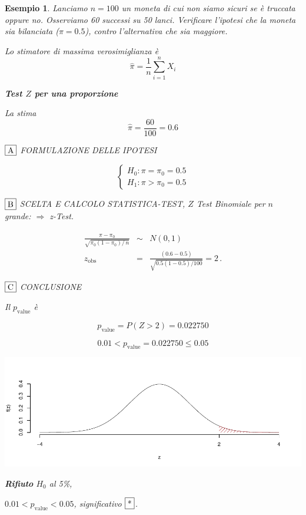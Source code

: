 \documentclass[
  11pt,
]{book}
\theoremstyle{mytheoremstyle}
\theoremstyle{mydefstyle}
\newtheorem{example}{{Esempio}}[section]
\begin{document}
\begin{example}
Lanciamo \(n=100\) un moneta di cui non siamo sicuri se è truccata oppure
no. Osserviamo 60 successi su 50 lanci. Verificare l'ipotesi che la moneta sia bilanciata (\(\pi=0.5\)), contro
l'alternativa che sia maggiore.

Lo stimatore di massima verosimiglianza è
\[\hat\pi=\frac 1 n \sum_{i=1}^n X_i\]

\textbf{Test \(Z\) per una proporzione}

La stima
\[\hat\pi=\frac { 60 } { 100 }= 0.6  \]

\(\fbox{A}\) FORMULAZIONE DELLE IPOTESI

\[\begin{cases}
   H_0: \pi = \pi_0=0.5 \\
   H_1: \pi > \pi_0=0.5 
   \end{cases}\]

\(\fbox{B}\) SCELTA E CALCOLO STATISTICA-TEST, \(Z\)
Test Binomiale per \(n\) grande: \(\Rightarrow\) z-Test.

\begin{eqnarray*}
   \frac{\hat\pi - \pi_{0}} {\sqrt {\pi_0(1-\pi_0)/\,n}}&\sim&N(0,1)\\
   z_{\text{obs}}
   &=& \frac{ ( 0.6 -  0.5 )} {\sqrt{ 0.5 (1- 0.5 )/ 100 }}
   =   2 \,.
   \end{eqnarray*}

\(\fbox{C}\) CONCLUSIONE

Il \(p_{\text{value}}\) è

\[ p_{\text{value}} = P(Z>2)=0.022750 \]

\[
 0.01 < p_\text{value}= 0.022750 \leq 0.05 
\]

\begin{center}\includegraphics{Appunti_di_Statistica_2025_files/figure-latex/15-test-mu-pi-10-1} \end{center}

\textbf{Rifiuto} \(H_0\) al 5\%,

\(0.01<p_\text{value}<0.05\), \emph{significativo} \(\fbox{*}\).
\end{example}
\end{document}
